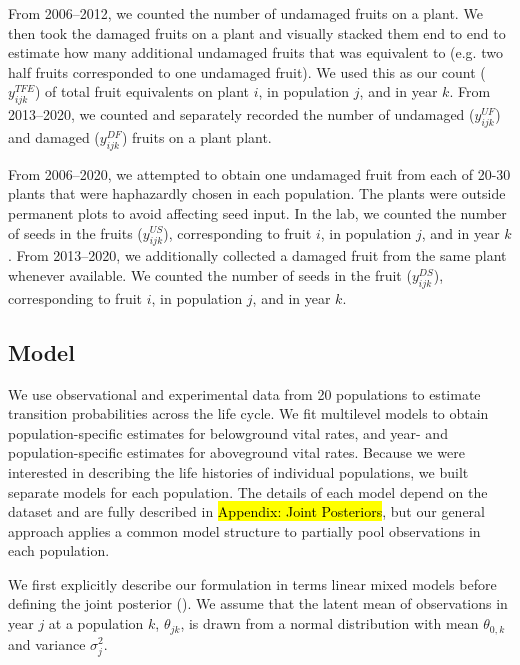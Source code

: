 \documentclass[12pt, oneside, titlepage]{article}   	%
\begin{document}
{From 2006--2012, we counted the number of undamaged fruits on a plant. We then took the damaged fruits on a plant and visually stacked them end to end to estimate how many additional undamaged fruits that was equivalent to (e.g. two half fruits corresponded to one undamaged fruit). We used this as our count ($y^{TFE}_{ijk}$) of total fruit equivalents on plant $i$, in population $j$, and in year $k$. From 2013--2020, we counted and separately recorded the number of undamaged ($y^{UF}_{ijk}$) and damaged ($y^{DF}_{ijk}$) fruits on a plant plant. 

From 2006--2020, we attempted to obtain one undamaged fruit from each of 20-30 plants that were haphazardly chosen in each population. The plants were outside permanent plots to avoid affecting seed input. In the lab, we counted the number of seeds in the fruits ($y^{US}_{ijk}$), corresponding to fruit $i$, in population $j$, and in year $k$. From 2013--2020, we additionally collected a damaged fruit from the same plant whenever available. We counted the number of seeds in the fruit ($y^{DS}_{ijk}$), corresponding to fruit $i$, in population $j$, and in year $k$.

%
\begin{singlespace*}
 \label{tab:datasets} 
\begin{center}

\end{center}
\end{singlespace*} 

\subsection{Model}

We use observational and experimental data from 20 populations to estimate transition probabilities across the life cycle. We fit multilevel models to obtain population-specific estimates for belowground vital rates, and year- and population-specific estimates for aboveground vital rates. Because we were interested in describing the life histories of individual populations, we built separate models for each population. The details of each model depend on the dataset and are fully described in \hl{Appendix: Joint Posteriors}, but our general approach applies a common model structure to partially pool observations in each population. 

We first explicitly describe our formulation in terms linear mixed models before defining the joint posterior (\cite{evans2010,ogle2020}). We assume that the latent mean of observations in year $j$ at a population $k$, $\theta_{jk}$, is drawn from a normal distribution with mean $\theta_{0,k}$ and variance $\sigma^2_j$.

}
\end{document}
